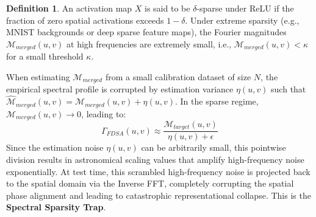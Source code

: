 \documentclass{article}
\theoremstyle{plain}
\theoremstyle{definition}
\newtheorem{definition}[theorem]{Definition}
\theoremstyle{remark}
\begin{document}
\begin{definition}
  An activation map $X$ is said to be $\delta$-sparse under ReLU if the fraction of zero spatial activations exceeds $1 - \delta$. Under extreme sparsity (e.g., MNIST backgrounds or deep sparse feature maps), the Fourier magnitudes $\mathcal{M}_{merged}(u, v)$ at high frequencies are extremely small, i.e., $\mathcal{M}_{merged}(u, v) < \kappa$ for a small threshold $\kappa$.
\end{definition}

When estimating $\mathcal{M}_{merged}$ from a small calibration dataset of size $N$, the empirical spectral profile is corrupted by estimation variance $\eta(u, v)$ such that $\hat{\mathcal{M}}_{merged}(u, v) = \mathcal{M}_{merged}(u, v) + \eta(u, v)$. In the sparse regime, $\mathcal{M}_{merged}(u, v) \to 0$, leading to:
\begin{equation}
  \Gamma_{FDSA}(u, v) \approx \frac{\mathcal{M}_{target}(u, v)}{\eta(u, v) + \epsilon}
\end{equation}
Since the estimation noise $\eta(u, v)$ can be arbitrarily small, this pointwise division results in astronomical scaling values that amplify high-frequency noise exponentially. At test time, this scrambled high-frequency noise is projected back to the spatial domain via the Inverse FFT, completely corrupting the spatial phase alignment and leading to catastrophic representational collapse. This is the \textbf{Spectral Sparsity Trap}.
\end{document}
